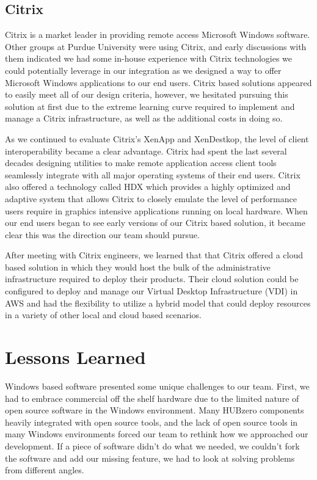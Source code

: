 \documentclass[conference]{../sty/IEEEtran}
\begin{document}
{\subsection{Citrix}

Citrix is a market leader in providing remote access Microsoft Windows software. Other groups at Purdue University were using Citrix, and early discussions with them indicated we had some in-house experience with Citrix technologies we could potentially leverage in our integration as we designed a way to offer Microsoft Windows applications to our end users. Citrix based solutions appeared to easily meet all of our design criteria, however, we hesitated pursuing this solution at first due to the extreme learning curve required to implement and manage a Citrix infrastructure, as well as the additional costs in doing so.

As we continued to evaluate Citrix’s XenApp and XenDestkop, the level of client interoperability became a clear advantage. Citrix had spent the last several decades designing utilities to make remote application access client tools seamlessly integrate with all major operating systems of their end users. Citrix also offered a technology called HDX which provides a highly optimized and adaptive system that allows Citrix to closely emulate the level of performance users require in graphics intensive applications running on local hardware. When our end users began to see early versions of our Citrix based solution, it became clear this was the direction our team should pursue.

After meeting with Citrix engineers, we learned that that Citrix offered a cloud based solution in which they would host the bulk of the administrative infrastructure required to deploy  their products. Their cloud solution could be configured to deploy and manage our Virtual Desktop Infrastructure (VDI) in AWS and had the flexibility to utilize a hybrid model that could deploy resources in a variety of other local and cloud based scenarios.



\section{Lessons Learned}

Windows based software presented some unique challenges to our team. First, we had to embrace commercial off the shelf hardware due to the limited nature of open source software in the Windows environment. Many HUBzero components heavily integrated with open source tools, and the lack of open source tools in many Windows environments forced our team to rethink how we approached our development. If a piece of software didn’t do what we needed, we couldn’t fork the software and add our missing feature, we had to look at solving problems from different angles.

}
\end{document}
